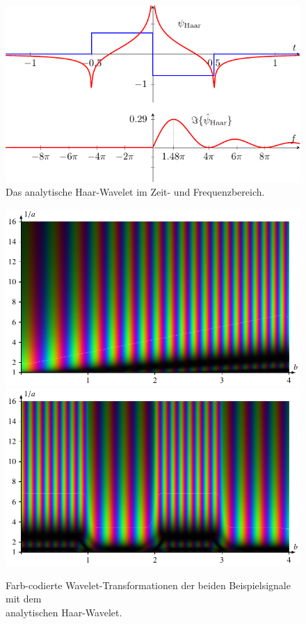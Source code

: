 \begin{figure}
	\centering
	\includegraphics{papers/complex/images/ahaar.pdf}
	\caption{Das analytische Haar-Wavelet im Zeit- und Frequenzbereich.}
	\label{complex:ahaar}
\end{figure}

\begin{figure}
	\centering
	\includegraphics{papers/complex/images/chirp_ahaar.pdf}
	\includegraphics{papers/complex/images/square_ahaar.pdf}
	\caption{Farb-codierte Wavelet-Transformationen der beiden Beispielsignale mit dem \\ analytischen Haar-Wavelet.}
	\label{complex:ahaar-ex}
\end{figure}
